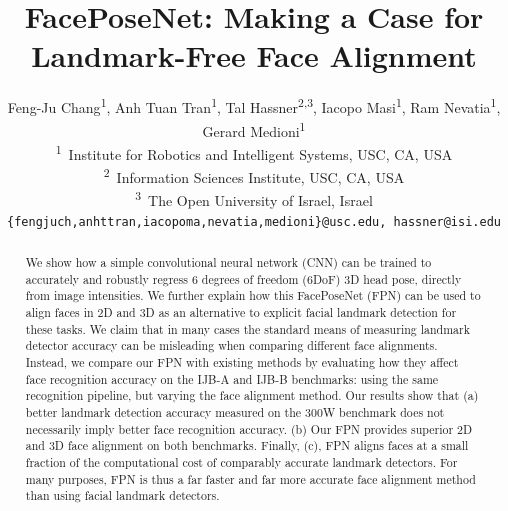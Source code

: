 \documentclass[10pt,twocolumn,letterpaper]{article}
\begin{document}
\title{FacePoseNet: Making a Case for Landmark-Free Face Alignment}

\author{Feng-Ju Chang\textsuperscript{1}, Anh Tuan Tran\textsuperscript{1}, Tal Hassner\textsuperscript{2,3}, Iacopo Masi\textsuperscript{1}, Ram Nevatia\textsuperscript{1}, Gerard Medioni\textsuperscript{1}\\
\textsuperscript{1}~Institute for Robotics and Intelligent Systems, USC, CA, USA\\
\textsuperscript{2}~Information Sciences Institute, USC, CA, USA\\
\textsuperscript{3}~The Open University of Israel, Israel\\
{\tt\small \{fengjuch,anhttran,iacopoma,nevatia,medioni\}@usc.edu, hassner@isi.edu}
}

\maketitle




\begin{abstract}
We show how a simple convolutional neural network (CNN) can be trained to accurately and robustly regress 6 degrees of freedom (6DoF) 3D head pose, directly from image intensities. We further explain how this FacePoseNet (FPN) can be used to align faces in 2D and 3D as an alternative to explicit facial landmark detection for these tasks. We claim that in many cases the standard means of measuring landmark detector accuracy can be misleading when comparing different face alignments. Instead, we compare our FPN with existing methods by evaluating how they affect face recognition accuracy on the IJB-A and IJB-B benchmarks: using the same recognition pipeline, but varying the face alignment method. Our results show that (a) better landmark detection accuracy measured on the 300W benchmark does not necessarily imply better face recognition accuracy. (b) Our FPN provides superior 2D and 3D face alignment on both benchmarks. Finally, (c), FPN aligns faces at a small fraction of the computational cost of comparably accurate landmark detectors. For many purposes, FPN is thus a far faster and far more accurate face alignment method than using facial landmark detectors.
\end{abstract}
\end{document}
